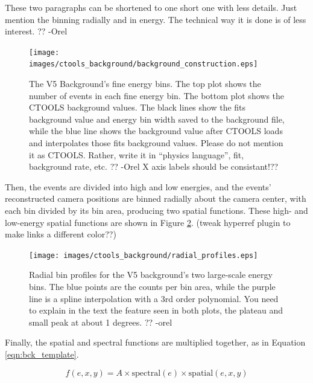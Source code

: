     {\color{red}These two paragraphs can be shortened to one short one with less details. Just mention the binning radially and in energy. The technical way it is done is of less interest. ?? -Orel}

    \begin{figure}[ht]
      \centering
      \texttt{[image: images/ctools\_background/background\_construction.eps]}
      \caption[CTOOLS Background Fine Energy Bins]{
        The V5 Background's fine energy bins.
        The top plot shows the number of events in each fine energy bin.
        The bottom plot shows the CTOOLS background values.
        The black lines show the fits background value and energy bin width saved to the background file, while the blue line shows the background value after CTOOLS loads and interpolates those fits background values.
        {\color{red}Please do not mention it as CTOOLS. Rather, write it in “physics language”, fit, background rate, etc. ?? -Orel}
        {\color{red}X axis labels should be consistant!??}
      }
      \label{fig:background_profile}
    \end{figure}

    Then, the events are divided into high and low energies, and the events' reconstructed camera positions are binned radially about the camera center, with each bin divided by its bin area, producing two spatial functions.
    These high- and low-energy spatial functions are shown in Figure \ref{fig:background_radial}.
    {\color{red}(tweak hyperref plugin to make links a different color??)}
    
    \begin{figure}[ht]
      \centering
      \texttt{[image: images/ctools\_background/radial\_profiles.eps]}
      \caption[CTOOLS Radial Background Profiles]{
        Radial bin profiles for the V5 background's two large-scale energy bins.
        The blue points are the counts per bin area, while the purple line is a spline interpolation with a 3rd order polynomial.
        {\color{red}You need to explain in the text the feature seen in both plots, the plateau and small peak at about 1 degrees. ?? -orel}
        }
      \label{fig:background_radial}
    \end{figure}
    
    Finally, the spatial and spectral functions are multiplied together, as in Equation \ref{eqn:bck_template}.
    
    \begin{equation}\label{eqn:bck_template}
      f(e,x,y) = A \times \textrm{spectral}(e) \times \textrm{spatial}(e,x,y) 
    \end{equation} 
    
